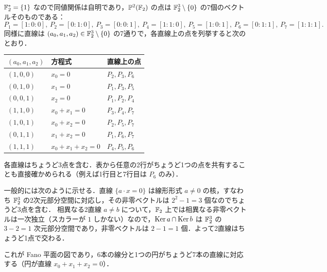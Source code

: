 $\mathbb{F}_2^*=\{1\}$ なので同値関係は自明であり，$\mathbb{P}^2(\mathbb{F}_2)$ の点は $\mathbb{F}_2^3\setminus\{0\}$ の7個のベクトルそのものである：
\[
  P_1=[1:0:0],\ P_2=[0:1:0],\ P_3=[0:0:1],\ P_4=[1:1:0],\ P_5=[1:0:1],\ P_6=[0:1:1],\ P_7=[1:1:1].
\]
同様に直線は $(a_0,a_1,a_2)\in\mathbb{F}_2^3\setminus\{0\}$ の7通りで，各直線上の点を列挙すると次のとおり．
\begin{center}
\renewcommand{\arraystretch}{1.2}
\begin{tabular}{lll}
\hline
$(a_0,a_1,a_2)$ & 方程式 & 直線上の点 \\
\hline
$(1,0,0)$ & $x_0=0$ & $P_2,P_3,P_6$ \\
$(0,1,0)$ & $x_1=0$ & $P_1,P_3,P_5$ \\
$(0,0,1)$ & $x_2=0$ & $P_1,P_2,P_4$ \\
$(1,1,0)$ & $x_0+x_1=0$ & $P_3,P_4,P_7$ \\
$(1,0,1)$ & $x_0+x_2=0$ & $P_2,P_5,P_7$ \\
$(0,1,1)$ & $x_1+x_2=0$ & $P_1,P_6,P_7$ \\
$(1,1,1)$ & $x_0+x_1+x_2=0$ & $P_4,P_5,P_6$ \\
\hline
\end{tabular}
\end{center}
各直線はちょうど3点を含む．表から任意の2行がちょうど1つの点を共有することも直接確かめられる（例えば1行目と7行目は $P_6$ のみ）．

一般的には次のように示せる．直線 $\{a\cdot x=0\}$ は線形形式 $a\neq0$ の核，すなわち $\mathbb{F}_2^3$ の2次元部分空間に対応し，その非零ベクトルは $2^2-1=3$ 個なのでちょうど3点を含む．
相異なる2直線 $a\neq b$ について，$\mathbb{F}_2$ 上では相異なる非零ベクトルは一次独立（スカラーが $1$ しかない）なので，$\operatorname{Ker} a\cap\operatorname{Ker} b$ は $\mathbb{F}_2^3$ の $3-2=1$ 次元部分空間であり，非零ベクトルは $2-1=1$ 個．よって2直線はちょうど1点で交わる．

\begin{center}
\end{center}
これが Fano 平面の図であり，6本の線分と1つの円がちょうど7本の直線に対応する（円が直線 $x_0+x_1+x_2=0$）．

